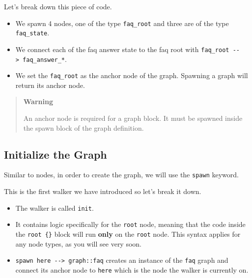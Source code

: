 Let's break down this piece of code.

\begin{itemize}
    \tightlist
    \item
          We spawn 4 nodes, one of the type \texttt{faq\_root} and three are of
          the type \texttt{faq\_state}.
    \item
          We connect each of the faq answer state to the faq root with
          \texttt{faq\_root\ -\/-\textgreater{}\ faq\_answer\_*}.
    \item
          We set the \texttt{faq\_root} as the anchor node of the graph.
          Spawning a graph will return its anchor node.
\end{itemize}

\begin{quote}
    \textbf{Warning}

    An anchor node is required for a graph block. It must be spawned inside
    the spawn block of the graph definition.
\end{quote}

\subsection{Initialize the Graph}\label{initialize-the-graph}

Similar to nodes, in order to create the graph, we will use the
\texttt{spawn} keyword.

\begin{Shaded}
    \begin{Highlighting}[]
        \OperatorTok{\{}
        \OperatorTok{\{}
        \OperatorTok{-->} \OperatorTok{::}\OperatorTok{;}
        \OperatorTok{\}}
        \OperatorTok{\}}
    \end{Highlighting}
\end{Shaded}

This is the first walker we have introduced so let's break it down.

\begin{itemize}
    \tightlist
    \item
          The walker is called \texttt{init}.
    \item
          It contains logic specifically for the \texttt{root} node, meaning
          that the code inside the \texttt{root\ \{\}} block will run
          \textbf{only} on the \texttt{root} node. This syntax applies for any
          node types, as you will see very soon.
    \item
          \texttt{spawn\ here\ -\/-\textgreater{}\ graph::faq} creates an
          instance of the \texttt{faq} graph and connect its anchor node to
          \texttt{here} which is the node the walker is currently on.
\end{itemize}

